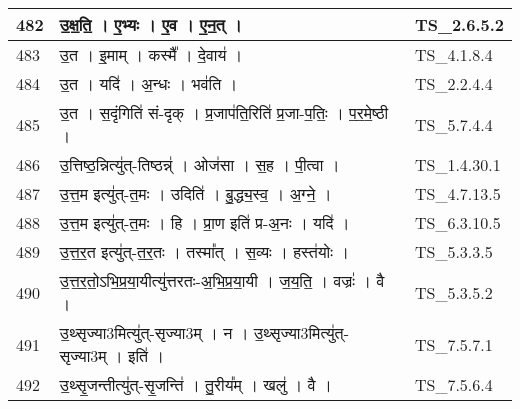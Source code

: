 \documentclass[17pt]{extarticle}
\begin{document}
\begin{longtable}{||p{0.4in}||p{4.9in}||p{0.9in}||}
    \hline
        
    482 & उ॒क्ष॒ति॒   ।   ए॒भ्यः   ।   ए॒व   ।   ए॒न॒त्   ।    & TS\_2.6.5.2       \\
    
    \hline
        
    483 & उ॒त   ।   इ॒माम्   ।   कस्मै᳚   ।   दे॒वाय॑   ।    & TS\_4.1.8.4       \\
    
    \hline
        
    484 & उ॒त   ।   यदि॑   ।   अ॒न्धः   ।   भव॑ति   ।    & TS\_2.2.4.4       \\
    
    \hline
        
    485 & उ॒त   ।   स॒दृंगिति॑ सं{-}दृक्   ।   प्र॒जाप॑ति॒रिति॑ प्र॒जा{-}प॒तिः॒   ।   प॒र॒मे॒ष्ठी   ।    & TS\_5.7.4.4       \\
    
    \hline
        
    486 & उ॒त्तिष्ठ॒न्नित्यु॑त्{-}तिष्ठन्न्॑   ।   ओज॑सा   ।   स॒ह   ।   पी॒त्वा   ।    & TS\_1.4.30.1       \\
    
    \hline
        
    487 & उ॒त्त॒म इत्यु॑त्{-}त॒मः   ।   उदिति॑   ।   बु॒द्ध्य॒स्व॒   ।   अ॒ग्ने॒   ।    & TS\_4.7.13.5       \\
    
    \hline
        
    488 & उ॒त्त॒म इत्यु॑त्{-}त॒मः   ।   हि   ।   प्रा॒ण इति॑ प्र{-}अ॒नः   ।   यदि॑   ।    & TS\_6.3.10.5       \\
    
    \hline
        
    489 & उ॒त्त॒र॒त इत्यु॑त्{-}त॒र॒तः   ।   तस्मा᳚त्   ।   स॒व्यः   ।   हस्त॑योः   ।    & TS\_5.3.3.5       \\
    
    \hline
        
    490 & उ॒त्त॒र॒तो॒ऽभि॒प्र॒या॒यीत्यु॑त्तरतः{-}अ॒भि॒प्र॒या॒यी   ।   ज॒य॒ति॒   ।   वज्रः॑   ।   वै   ।    & TS\_5.3.5.2       \\
    
    \hline
        
    491 & उ॒थ्सृज्या3मित्यु॑त्{-}सृज्या3म्   ।   न   ।   उ॒थ्सृज्या3मित्यु॑त्{-} सृज्या3म्   ।   इति॑   ।    & TS\_7.5.7.1       \\
    
    \hline
        
    492 & उ॒थ्सृ॒जन्तीत्यु॑त्{-}सृ॒जन्ति॑   ।   तु॒रीय᳚म्   ।   खलु॑   ।   वै   ।    & TS\_7.5.6.4       \\
    

\end{longtable}
\end{document}
